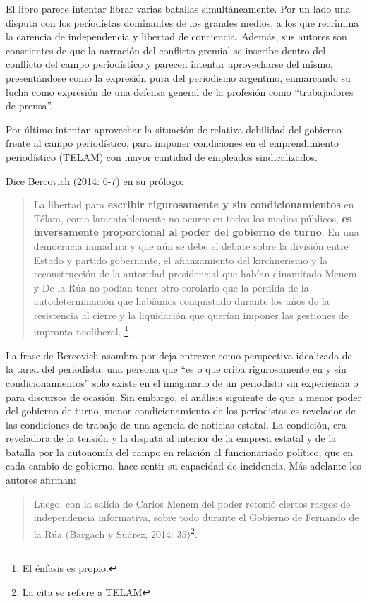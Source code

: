 El libro parece intentar librar varias batallas simultáneamente. Por un lado una disputa con los periodistas dominantes de los grandes medios, a los que recrimina la carencia de independencia y libertad de conciencia. Además, sus autores son conscientes de que la narración del conflicto gremial se inscribe dentro del conflicto del campo periodístico y parecen intentar aprovecharse del mismo, presentándose como la expresión pura del periodismo argentino, enmarcando su lucha como expresión de una defensa general de la profesión como \enquote{trabajadores de prensa}.

Por último intentan aprovechar la situación de relativa debilidad del gobierno frente al campo periodístico, para imponer condiciones en el emprendimiento periodístico (TELAM) con mayor cantidad de empleados sindicalizados.

Dice Bercovich (2014: 6-7) en su prólogo:

\begin{quote}
La libertad para \textbf{escribir rigurosamente y sin condicionamientos} en Télam, como lamentablemente no ocurre en todos los medios públicos, \textbf{es inversamente proporcional al poder del gobierno de turno}. En una democracia inmadura y que aún se debe el debate sobre la división entre Estado y partido gobernante, el afianzamiento del kirchnerismo y la reconstrucción de la autoridad presidencial que habían dinamitado Menem y De la Rúa no podían tener otro corolario que la pérdida de la autodeterminación que habíamos conquistado durante los años de la resistencia al cierre y la liquidación que querían imponer las gestiones de impronta neoliberal. \footnote{El énfasis es propio.}
\end{quote}

La frase de Bercovich asombra por  deja entrever como perspectiva idealizada de la tarea del periodista: una persona que \enquote{es o que criba rigurosamente en y sin condicionamientos} solo existe en el imaginario de un periodista sin experiencia o para discursos de ocasión. Sin embargo, el análisis siguiente  de que a menor poder del gobierno de turno, menor condicionamiento de los periodistas es revelador de las condiciones de trabajo de una agencia de noticias estatal. La condición, era reveladora de la tensión y la disputa al interior de la empresa estatal y de la batalla por la autonomía del campo en relación al funcionariado político, que en cada cambio de gobierno, hace sentir su capacidad de incidencia. Más adelante los autores afirman:

\begin{quote}
Luego, con la salida de Carlos Menem del poder retomó ciertos rasgos de independencia informativa, sobre todo durante el Gobierno de Fernando de la Rúa (Bargach y Suárez, 2014: 35)\footnote{La cita se refiere a TELAM}.
\end{quote}

